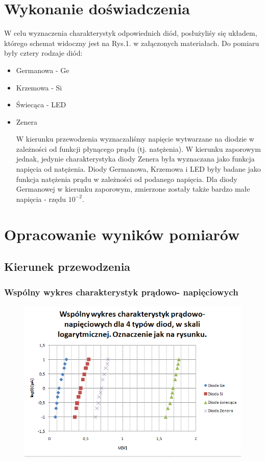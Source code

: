 \documentclass[11pt]{article}
\begin{document}
\section{Wykonanie doświadczenia}
W celu wyznaczenia charakterystyk odpowiednich diód, posłużyliśy się układem, którego schemat widoczny jest na Rys.1. w załączonych materiałach. Do pomiaru były cztery rodzaje diód:
\begin{itemize}
    \item{Germanowa - Ge}
    \item{Krzemowa - Si}
    \item{Świecąca - LED}
    \item{Zenera}

W kierunku przewodzenia wyznaczaliśmy napięcie wytwarzane na diodzie w zależności od funkcji płynącego prądu (tj. natężenia).
W kierunku zaporowym jednak, jedynie charakterystyka diody Zenera była wyznaczana jako funkcja napięcia od natężenia. Diody Germanowa, Krzemowa i LED były badane jako funkcja natężenia prądu w zależności od podanego napięcia. Dla diody Germanowej w kierunku zaporowym, zmierzone zostały także bardzo małe napięcia - rzędu $10^{-2}$.
\end{itemize}
\section{Opracowanie wyników pomiarów}
\subsection{Kierunek przewodzenia}
\subsubsection{Wspólny wykres charakterystyk prądowo- napięciowych  }

\begin{figure}[H]
    \centering
    \includegraphics[height=0.27\paperheight]{graph1}
    \label{fig:graph1}
\end{figure}
\end{document}
